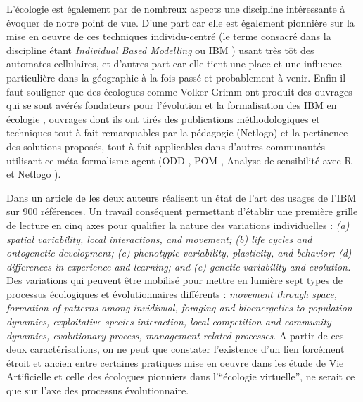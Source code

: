 

L'écologie est également par de nombreux aspects une discipline intéressante à évoquer de notre point de vue. D'une part car elle est également pionnière sur la mise en oeuvre de ces techniques individu-centré (le terme consacré dans la discipline étant \textit{Individual Based Modelling} ou IBM ) usant très tôt des automates cellulaires, et d'autres part car elle tient une place et une influence particulière dans la géographie à la fois passé et probablement à venir. Enfin il faut souligner que des écologues comme Volker Grimm ont produit des ouvrages qui se sont avérés fondateurs pour l'évolution et la formalisation des IBM en écologie \autocites{Grimm2004, DeAngelis2014}, ouvrages dont ils ont tirés des publications méthodologiques et techniques \autocite{Railsback2012} tout à fait remarquables par la pédagogie (Netlogo) et la pertinence des solutions proposés, tout à fait applicables dans d'autres communautés utilisant ce méta-formalisme agent (ODD \autocite{Grimm2010}, POM \autocite{Grimm2005,Grimm2011}, Analyse de sensibilité avec R et Netlogo \autocite{Thiele2011,Thiele2014a}). %

Dans un article de \textcite{DeAngelis2005} les deux auteurs réalisent un état de l'art des usages de l'IBM sur 900 références. Un travail conséquent permettant d'établir une première grille de lecture en cinq axes pour qualifier la nature des variations individuelles : \textit{(a) spatial variability, local interactions, and movement; (b) life cycles and ontogenetic development; (c) phenotypic variability, plasticity, and behavior; (d) differences in experience and learning; and (e) genetic variability and evolution.} Des variations qui peuvent être mobilisé pour mettre en lumière sept types de processus écologiques et évolutionnaires différents : \textit{movement through space, formation of patterns among invidivual, foraging and bioenergetics to population dynamics, exploitative species interaction, local competition and community dynamics, evolutionary process, management-related processes}. A partir de ces deux caractérisations, on ne peut que constater l'existence d'un lien forcément étroit \autocite{Dorin2008} et ancien \autocites{Hogeweg1988, Hogeweg1990, DeAngelis2014} entre certaines pratiques mise en oeuvre dans les étude de Vie Artificielle et celle des écologues pionniers dans l'\enquote{écologie virtuelle}, ne serait ce que sur l'axe des processus évolutionnaire.

